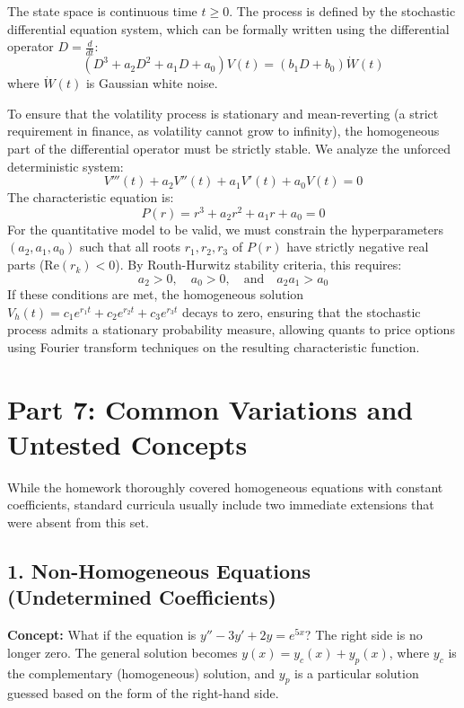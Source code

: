 \documentclass[11pt, a4paper]{article}
\theoremstyle{definition}
\theoremstyle{remark}
\begin{document}
The state space is continuous time $t \ge 0$. The process is defined by the stochastic differential equation system, which can be formally written using the differential operator $D = \frac{d}{dt}$:
\[ (D^3 + a_2 D^2 + a_1 D + a_0) V(t) = (b_1 D + b_0) \dot{W}(t) \]
where $\dot{W}(t)$ is Gaussian white noise. 

To ensure that the volatility process is stationary and mean-reverting (a strict requirement in finance, as volatility cannot grow to infinity), the homogeneous part of the differential operator must be strictly stable. We analyze the unforced deterministic system:
\[ V'''(t) + a_2 V''(t) + a_1 V'(t) + a_0 V(t) = 0 \]
The characteristic equation is:
\[ P(r) = r^3 + a_2 r^2 + a_1 r + a_0 = 0 \]
For the quantitative model to be valid, we must constrain the hyperparameters $(a_2, a_1, a_0)$ such that all roots $r_1, r_2, r_3$ of $P(r)$ have strictly negative real parts ($\text{Re}(r_k) < 0$). By Routh-Hurwitz stability criteria, this requires:
\[ a_2 > 0, \quad a_0 > 0, \quad \text{and} \quad a_2 a_1 > a_0 \]
If these conditions are met, the homogeneous solution $V_h(t) = c_1 e^{r_1 t} + c_2 e^{r_2 t} + c_3 e^{r_3 t}$ decays to zero, ensuring that the stochastic process admits a stationary probability measure, allowing quants to price options using Fourier transform techniques on the resulting characteristic function.

\newpage
\section{Part 7: Common Variations and Untested Concepts}

While the homework thoroughly covered homogeneous equations with constant coefficients, standard curricula usually include two immediate extensions that were absent from this set.

\subsection{1. Non-Homogeneous Equations (Undetermined Coefficients)}
\textbf{Concept:} What if the equation is $y'' - 3y' + 2y = e^{5x}$? The right side is no longer zero. The general solution becomes $y(x) = y_c(x) + y_p(x)$, where $y_c$ is the complementary (homogeneous) solution, and $y_p$ is a particular solution guessed based on the form of the right-hand side.
\end{document}
